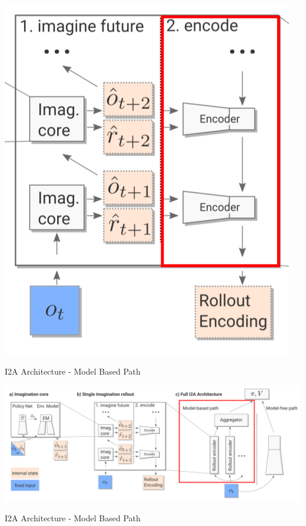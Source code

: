 	\begin{center}
    \includegraphics[height=.5\textheight]{./Images/encoder.png}%
	\end{center}



I2A Architecture - Model Based Path


\includegraphics[width=\columnwidth]{./Images/i2a_all_model_based_path.png}%



I2A Architecture - Model Based Path


